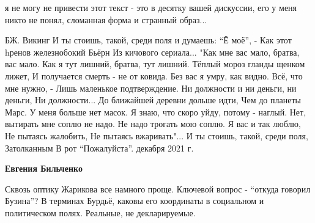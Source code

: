 \begin{itemize}
\begin{itemize}
я не могу не привести этот текст - это в десятку вашей дискуссии, его у меня
никто не понял, сломанная форма и странный образ...


\begin{multicols}{2} %
\obeycr
БЖ. Викинг
\smallskip
И ты стоишь, такой, среди поля и думаешь:
\enquote{Ё моё}, -
Как этот hренов железнобокий Бьёрн
Из кичового сериала...
\smallskip
"Как мне вас мало, братва, вас мало.
Как я тут лишний, братва, тут лишний.
Тёплый мороз гланды щенком лижет,
И получается смерть - не от ковида.
\smallskip
Без вас я умру, как видно.
Всё, что мне нужно, -
Лишь маленькое подтверждение.
\smallskip
Ни должности и ни деньги, ни деньги,
Ни должности...
До ближайшей деревни дольше идти,
Чем до планеты Марс.
\smallskip
У меня больше нет масок.
Я знаю, что скоро уйду, потому - наглый.
Нет, вытирать мне соплю не надо.
Не надо трогать мою соплю.
\smallskip
Я вас и так люблю,
Не пытаясь жалобить,
Не пытаясь вжаривать"...
\smallskip
И ты стоишь, такой, среди поля,
Затолканным
В рот
\enquote{Пожалуйста}.
 декабря 2021 г.
\restorecr
\end{multicols} %


\textbf{Евгения Бильченко} 

Сквозь оптику Жарикова все намного проще. Ключевой вопрос - \enquote{откуда говорил
Бузина}? В терминах Бурдьё, каковы его координаты в социальном и политическом
полях. Реальные, не декларируемые.


\end{itemize} %

\end{itemize} %
